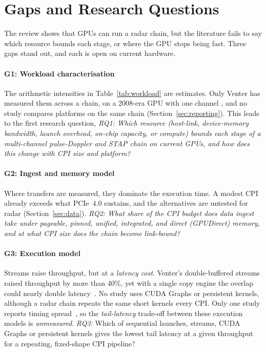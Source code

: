 \section{Gaps and Research Questions}
\label{sec:gaps}
The review shows that GPUs can run a radar chain, but the literature fails to say which resource bounds each stage, or where the GPU stops being fast. Three gaps stand out, and each is open on current hardware.

\paragraph{G1: Workload characterisation}
The arithmetic intensities in Table~\ref{tab:workload} are estimates.
Only Venter has measured them across a chain, on a 2008-era GPU with one channel \cite{venterSOFTWAREDEFINEDPULSEDOPPLERRADAR},
and no study compares platforms on the same chain (Section~\ref{sec:reporting}). This leads to the first research question, \emph{RQ1: Which resource (host-link, device-memory bandwidth, launch overhead, on-chip capacity, or compute) bounds each stage of a multi-channel pulse-Doppler and STAP chain on current GPUs, and how does this change with CPI size and platform?}

\paragraph{G2: Ingest and memory model}
Where transfers are measured, they dominate the execution time. A modest CPI already exceeds what PCIe~4.0 sustains,
and the alternatives are untested for radar (Section~\ref{sec:data}).
\emph{RQ2: What share of the CPI budget does data ingest take under pageable, pinned, unified, integrated, and direct (GPUDirect) memory, and at what CPI size does the chain become link-bound?}

\paragraph{G3: Execution model}
Streams raise throughput, but at a \emph{latency cost}. Venter's double-buffered streams raised throughput by more than 40\%, yet with a single copy engine the overlap could nearly double latency~\cite{venterSOFTWAREDEFINEDPULSEDOPPLERRADAR}. No study uses CUDA Graphs or persistent kernels, although a radar chain repeats the same short kernels every CPI. Only one study reports timing spread~\cite{zaknounRealTimeGPUacceleratedProcessing}, so the \emph{tail-latency} trade-off between these execution models is \emph{unmeasured}. \textit{RQ3:} Which of sequential launches, streams, CUDA Graphs or persistent kernels gives the lowest tail latency at a given throughput for a repeating, fixed-shape CPI pipeline?

